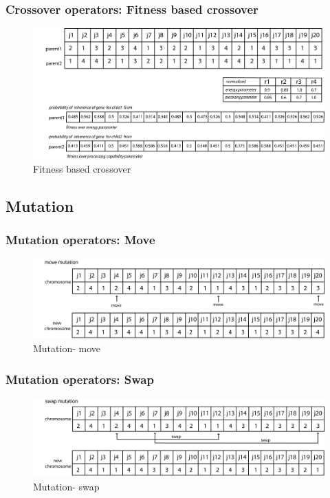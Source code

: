 \documentclass{beamer}
\begin{document}
\begin{frame}
\frametitle{Crossover operators: Fitness based crossover}
\begin{figure}[!h]
    \includegraphics[width=\textwidth]{imgs/crossover5}
    \caption{Fitness based crossover}
\end{figure}
\end{frame}

\subsection*{Mutation}
\begin{frame}
\frametitle{Mutation operators: Move}
\begin{figure}[!h]
    \includegraphics[width=\textwidth]{imgs/mutation1}
    \caption{Mutation- move}
\end{figure}
\end{frame}

\begin{frame}
\frametitle{Mutation operators: Swap}
\begin{figure}[h]
    \centering
    \includegraphics[width=\textwidth]{imgs/mutation2}
    \caption{Mutation- swap}
\end{figure}
\end{frame}
\end{document}
